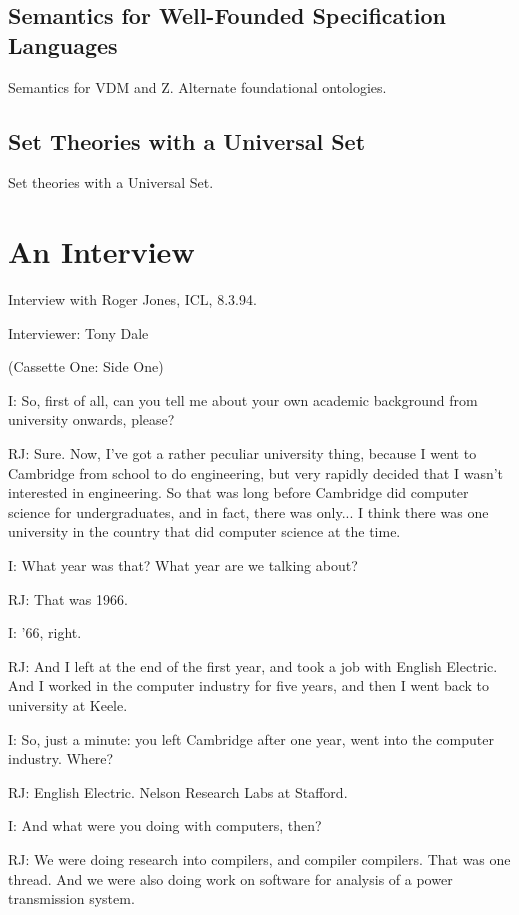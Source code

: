 \documentclass[10pt,titlepage]{book}
\begin{document}
\section{Semantics for Well-Founded Specification Languages}

Semantics for VDM and Z.
Alternate foundational ontologies.

\section{Set Theories with a Universal Set}
Set theories with a Universal Set.

\chapter{An Interview}

Interview with Roger Jones, ICL, 8.3.94.

Interviewer: Tony Dale 

(Cassette One: Side One)

I: So, first of all, can you tell me about your own academic background from university onwards, please?

RJ: Sure. Now, I've got a rather peculiar university thing, because I went to Cambridge from school to do engineering, but very rapidly decided that I wasn't interested in engineering. So that was long before Cambridge did computer science for undergraduates, and in fact, there was only... I think there was one university in the country that did computer science at the time.

I: What year was that? What year are we talking about?

RJ: That was 1966.

I: '66, right.

RJ: And I left at the end of the first year, and took a job with English Electric. And I worked in the computer industry for five years, and then I went back to university at Keele.

I: So, just a minute: you left Cambridge after one year, went into the computer industry. Where?

RJ: English Electric. Nelson Research Labs at Stafford.

I: And what were you doing with computers, then?

RJ: We were doing research into compilers, and compiler compilers. That was one thread. And we were also doing work on software for analysis of a power transmission system.
\end{document}
